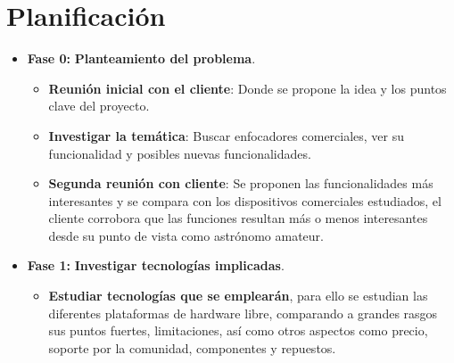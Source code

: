 \section{Planificación}

\begin{itemize}
	\item \textbf{Fase 0:} \textbf{Planteamiento del problema}.
	\begin{itemize}
		\item \textbf{Reunión inicial con el cliente}: Donde se propone la idea y los puntos clave del proyecto. 
		\item \textbf{Investigar la temática}: Buscar enfocadores comerciales, ver su funcionalidad y posibles nuevas funcionalidades.
		\item \textbf{Segunda reunión con cliente}: Se proponen las funcionalidades más interesantes y se compara con los dispositivos comerciales estudiados, el cliente corrobora que las funciones resultan más o menos interesantes desde su punto de vista como astrónomo amateur.
	\end{itemize}
	\item \textbf{Fase 1:} \textbf{Investigar tecnologías implicadas}.
	\begin{itemize}
		\item \textbf{Estudiar tecnologías que se emplearán}, para ello se estudian las diferentes plataformas de hardware libre, comparando a grandes rasgos sus puntos fuertes, limitaciones, así como otros aspectos como precio, soporte por la comunidad, componentes y repuestos.
		

\end{itemize}
\end{itemize}
